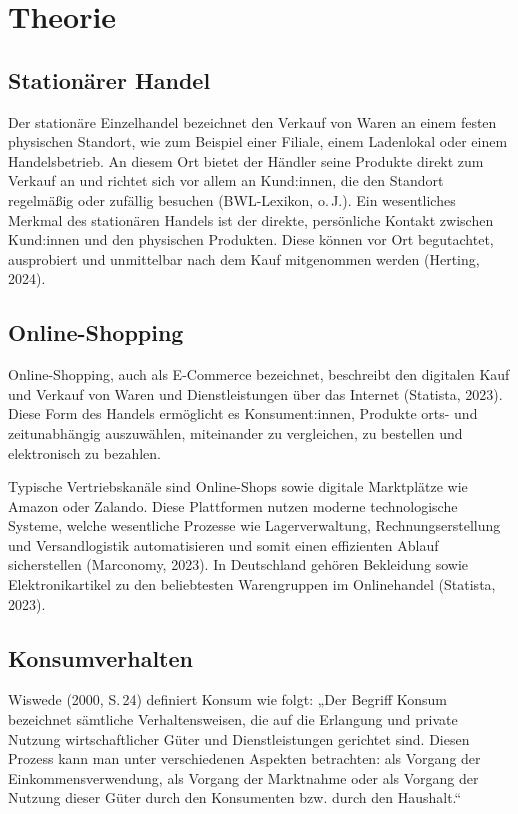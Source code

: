 \section{Theorie}
\subsection{Stationärer Handel}
Der stationäre Einzelhandel bezeichnet den Verkauf von Waren an einem festen physischen Standort, wie zum Beispiel einer Filiale, einem Ladenlokal oder einem Handelsbetrieb. An diesem Ort bietet der Händler seine Produkte direkt zum Verkauf an und richtet sich vor allem an Kund:innen, die den Standort regelmäßig oder zufällig besuchen (BWL-Lexikon, o. J.). Ein wesentliches Merkmal des stationären Handels ist der direkte, persönliche Kontakt zwischen Kund:innen und den physischen Produkten. Diese können vor Ort begutachtet, ausprobiert und unmittelbar nach dem Kauf mitgenommen werden (Herting, 2024). 

\subsection{Online-Shopping}
Online-Shopping, auch als E-Commerce bezeichnet, beschreibt den digitalen Kauf und Verkauf von Waren und Dienstleistungen über das Internet (Statista, 2023). Diese Form des Handels ermöglicht es Konsument:innen, Produkte orts- und zeitunabhängig auszuwählen, miteinander zu vergleichen, zu bestellen und elektronisch zu bezahlen. 

Typische Vertriebskanäle sind Online-Shops sowie digitale Marktplätze wie Amazon oder Zalando. Diese Plattformen nutzen moderne technologische Systeme, welche wesentliche Prozesse wie Lagerverwaltung, Rechnungserstellung und Versandlogistik automatisieren und somit einen effizienten Ablauf sicherstellen (Marconomy, 2023). In Deutschland gehören Bekleidung sowie Elektronikartikel zu den beliebtesten Warengruppen im Onlinehandel (Statista, 2023).

\subsection{Konsumverhalten}
Wiswede (2000, S. 24) definiert Konsum wie folgt: 
„Der Begriff Konsum bezeichnet sämtliche Verhaltensweisen, die auf die Erlangung und private Nutzung wirtschaftlicher Güter und Dienstleistungen gerichtet sind. Diesen Prozess kann man unter verschiedenen Aspekten betrachten: als Vorgang der Einkommensverwendung, als Vorgang der Marktnahme oder als Vorgang der Nutzung dieser Güter durch den Konsumenten bzw. durch den Haushalt.“ 

